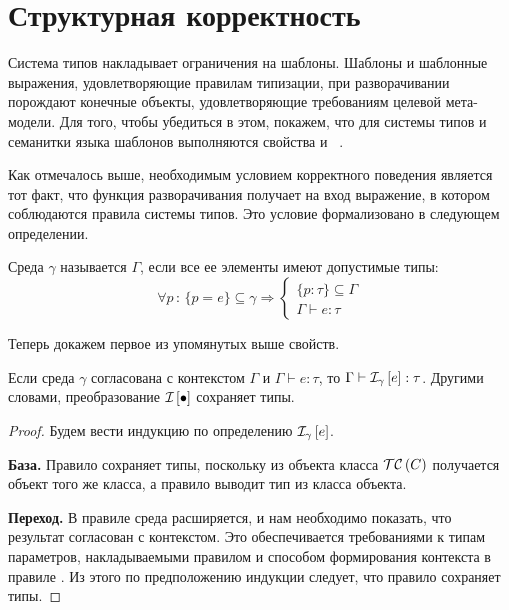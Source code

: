 {\section{Структурная корректность}

Система типов накладывает ограничения на шаблоны. Шаблоны и шаблонные выражения, удовлетворяющие правилам типизации, при разворачивании порождают конечные объекты, удовлетворяющие требованиям целевой мета-модели.
Для того, чтобы убедиться в этом, покажем, что для системы типов и семанитки языка шаблонов выполняются свойства  и ~\cite{Pierce}. 

Как отмечалось выше, необходимым условием корректного поведения является тот факт, что функция разворачивания получает на вход выражение, в котором соблюдаются правила системы типов. Это условие формализовано в следующем определении.

\begin{Def}\label{agree}
Среда $\gamma$ называется  $\Gamma$, если все ее элементы имеют допустимые типы:
$$
	\forall p \, : \, 
		\{p = e\} \subseteq \gamma 
			\Rightarrow 
		\left\{\begin{array}{l}		
		\{p : \tau\} \subseteq \Gamma \\
		\Gamma \vdash e : \tau
		\end{array}\right.
$$
\end{Def}

Теперь докажем первое из упомянутых выше свойств.

\begin{Th}\label{ThTP}
Если среда $\gamma$ согласована с контекстом $\Gamma$ и \mbox{$\Gamma \vdash e : \tau$}, то \mbox{$\Gamma \vdash \mathcal{I}_{\gamma} \left[ e \right] : \tau$}. Другими словами, преобразование $\mathcal{I}_{} \left[ \bullet \right]$ сохраняет типы.
\end{Th}
\begin{proof}
Будем вести индукцию по определению $\mathcal{I}_{\gamma} \left[ e \right]$.

\noindent\textbf{База.} Правило  сохраняет типы, поскольку из объекта класса $\mathcal{TC}\left(C\right)$ получается объект того же класса, а правило  выводит тип из класса объекта.

\noindent\textbf{Переход.} 
В правиле  среда расширяется, и нам необходимо показать, что результат согласован с контекстом. Это обеспечивается требованиями к типам параметров, накладываемыми правилом  и способом формирования контекста в правиле . Из этого по предположению индукции следует, что правило  сохраняет типы.


\end{proof}}
